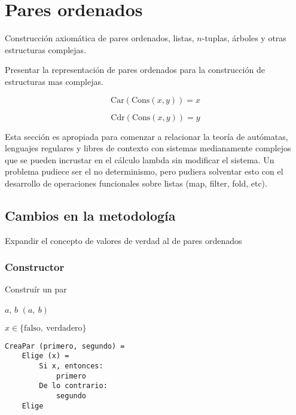 \section{Pares ordenados}
\label{sec:pares-ordenados}

Construcción axiomática de pares ordenados, listas, \( n \)-tuplas, árboles y otras estructuras complejas.

Presentar la representación de pares ordenados para la construcción de estructuras mas complejas.

\[ \mathrm{Car}(\mathrm{Cons}(x,y)) = x \]

\[ \mathrm{Cdr}(\mathrm{Cons}(x,y)) = y \]

Esta sección es apropiada para comenzar a relacionar la teoría de autómatas, lenguajes regulares y libres de contexto con sistemas medianamente complejos que se pueden incrustar en el cálculo lambda sin modificar el sistema. Un problema pudiece ser el no determinismo, pero pudiera solventar esto con el desarrollo de operaciones funcionales sobre listas (map, filter, fold, etc).

\subsection*{Cambios en la metodología}

Expandir el concepto de valores de verdad al de pares ordenados

\subsubsection*{Constructor}

\begin{algorithm}
  \caption{Construír un par}
  \begin{algorithmic}
    \REQUIRE \( a \), \( b \)
    \ENSURE \( (a,\ b) \)

    \begin{algorithmic}
      \REQUIRE \( x \in \{ \mathrm{falso},\ \mathrm{verdadero} \} \)
    \end{algorithmic}
  \end{algorithmic}
\end{algorithm}

\begin{verbatim}
CreaPar (primero, segundo) =
    Elige (x) =
        Si x, entonces:
            primero
        De lo contrario:
            segundo
    Elige
\end{verbatim}

